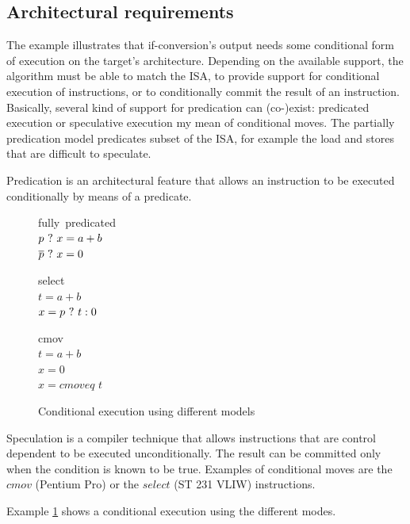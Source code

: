 \subsection{Architectural requirements}
The example illustrates that if-conversion's output needs some conditional form of execution on the target's architecture. Depending on the available support, the algorithm must be able to match the ISA, to provide support for conditional execution of instructions, or to conditionally commit the result of an instruction.
Basically, several kind of support for predication can (co-)exist: predicated execution  or speculative execution my mean of conditional moves. The partially predication model predicates subset of the ISA, for example the load and stores that are difficult to speculate.

Predication is an architectural feature that allows an instruction to be executed conditionally by means of a predicate.

\begin{figure}
\begin{minipage}[t]{3cm}
\mbox{fully predicated} \\
$p ~?~ x = a + b $ \\
$\overline{p} ~?~ x = 0 $ \\
\end{minipage}
\begin{minipage}[t]{3cm}
\mbox{select} \\
$t = a + b $ \\
$x= p ~?~ t : 0 $ \\
\end{minipage}
\begin{minipage}[t]{3cm}
\mbox{cmov} \\
$t = a + b $ \\
$x = 0 $ \\
$x = cmoveq$ $t$ \\
\end{minipage}
\caption{Conditional execution using different models}
\label{fig:pred}
\end{figure}

Speculation is a compiler technique that allows instructions that are control dependent to be executed unconditionally. The result can be committed only when the condition is known to be true. Examples of conditional moves are the $cmov$ (Pentium Pro) or the $select$ (ST 231 VLIW) instructions.

Example \ref{fig:pred} shows a conditional execution using the different modes.

